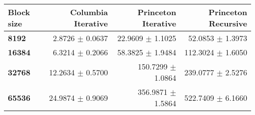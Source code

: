 \begin{tabular}{lrrr}\toprule
\textbf{Block size}  & \textbf{Columbia Iterative} & \textbf{Princeton Iterative} & \textbf{Princeton Recursive}\\\midrule
\textbf{8192}  & 2.8726 $\pm$ 0.0637 & 22.9609 $\pm$ 1.1025 & 52.0853 $\pm$ 1.3973\\
\textbf{16384}  & 6.3214 $\pm$ 0.2066 & 58.3825 $\pm$ 1.9484 & 112.3024 $\pm$ 1.6050\\
\textbf{32768}  & 12.2634 $\pm$ 0.5700 & 150.7299 $\pm$ 1.0864 & 239.0777 $\pm$ 2.5276\\
\textbf{65536} & 24.9874 $\pm$ 0.9069 & 356.9871 $\pm$ 1.5864 & 522.7409 $\pm$ 6.1660\\
\bottomrule
\end{tabular}
